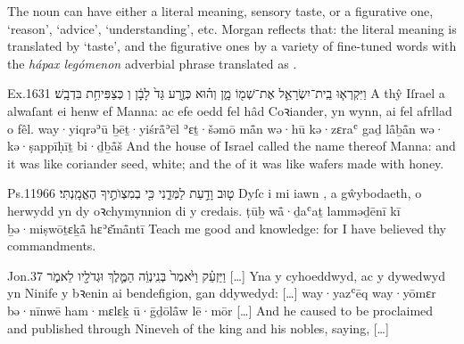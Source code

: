 
\begin{paper}
	The noun  can have either a literal meaning, sensory taste, or a figurative one, ‘reason’, ‘advice’, ‘understanding’, etc. Morgan reflects that: the literal meaning is translated by  ‘taste’, and the figurative ones by a variety of fine-tuned words  with the \textit{hápax legómenon} adverbial phrase  translated as .
\end{paper}

\begin{example}{Ex.}{16}{31}{}{}
	\quoling
	{וַיִּקְרְא֧וּ בֵֽית־יִשְׂרָאֵ֛ל אֶת־שְׁמ֖וֹ מָ֑ן וְה֗וּא כְּזֶ֤רַע גַּד֙ לָבָ֔ן וְ כְּצַפִּיחִ֥ת בִּדְבָֽשׁ׃}
	{A thŷ Iſrael a alwaſant ei henw ef Manna: ac efe oedd fel hâd Coꝛiander, yn wynn, ai  fel afrllad o fêl.}
	{way·yiqrəʾū ḇēṯ·yiśrå̄ʾēl ʾɛṯ·šəmō må̄n wə·hū kə·zɛraʿ gaḏ lå̄ḇå̄n wə· kə·ṣappīḥīṯ bi·ḏḇå̄š}
	{And the house of Israel called the name thereof Manna: and it was like coriander seed, white; and the  of it was like wafers made with honey.}
\end{example}

\begin{example}{Ps.}{119}{66}{}{}
	\quoling
	{ט֤וּב  וָדַ֣עַת לַמְּדֵ֑נִי כִּ֖י בְמִצְוֺתֶ֣יךָ הֶאֱמָֽנְתִּי׃}
	{Dyſc i mi iawn , a gŵybodaeth, o herwydd yn dy oꝛchymynnion di y credais.}
	{ṭūḇ  wå̄·ḏaʿaṯ lamməḏēnī kī ḇə·miṣwōṯɛḵå̄ hɛʾɛ̆må̄ntī}
	{Teach me good  and knowledge: for I have believed thy commandments.}
\end{example}


\begin{example}{Jon.}{3}{7}{}{}
	\quoling
	{וַיַּזְעֵ֗ק וַיֹּ֙אמֶר֙ בְּנִֽינְוֵ֔ה  הַמֶּ֛לֶךְ וּגְדֹלָ֖יו לֵאמֹ֑ר […]}
	{Yna y cyhoeddwyd, ac y dywedwyd yn Ninife  y bꝛenin ai bendefigion, gan ddywedyd: […]}
	{way·yazʿēq way·yōmɛr bə·nīnwē  ham·mɛlɛḵ ū·ḡḏōlå̄w lē·mōr […]}
	{And he caused  to be proclaimed and published through Nineveh  of the king and his nobles, saying, […]}
\end{example}



